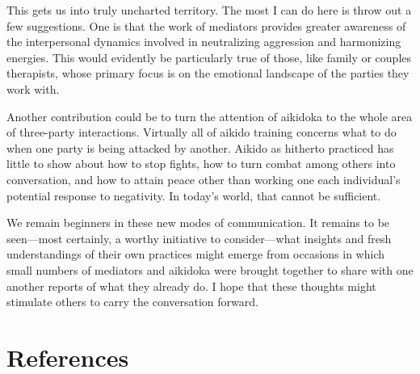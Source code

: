 This gets us into truly uncharted territory. The most I can do here is throw out a few suggestions. One is that the work of mediators provides greater awareness of the interpersonal dynamics involved in neutralizing aggression and harmonizing energies. This would evidently be particularly true of those, like family or couples therapists, whose primary focus is on the emotional landscape of the parties they work with.

Another contribution could be to turn the attention of aikidoka to the whole area of three-party interactions. Virtually all of aikido training concerns what to do when one party is being attacked by another. Aikido as hitherto practiced has little to show about how to stop fights, how to turn combat among others into conversation, and how to attain peace other than working one each individual's potential response to negativity. In today's world, that cannot be sufficient.

We remain beginners in these new modes of communication. It remains to be seen---most certainly, a worthy initiative to consider---what insights and fresh understandings of their own practices might emerge from occasions in which small numbers of mediators and aikidoka were brought together to share with one another reports of what they already do. I hope that these thoughts might stimulate others to carry the conversation forward.

\section*{References}

